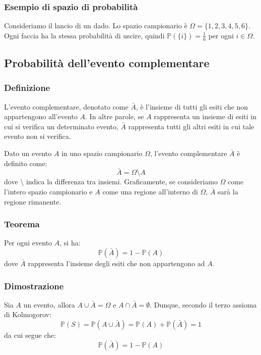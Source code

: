 \documentclass{article}
\begin{document}
\subsubsection{Esempio di spazio di probabilità}
Consideriamo il lancio di un dado. Lo spazio campionario è \(\Omega = \{1, 2, 3, 4, 5, 6\}\).
Ogni faccia ha la stessa probabilità di uscire, quindi \(\mathbb{P}(\{i\}) = \frac{1}{6}\)
per ogni \(i \in \Omega\).

\newpage
\subsection{Probabilità dell'evento complementare}

\subsubsection{Definizione}
L'evento complementare, denotato come \(\bar{A}\), è l'insieme di tutti gli esiti che non
appartengono all'evento \(A\). In altre parole, se \(A\) rappresenta un insieme di esiti in
cui si verifica un determinato evento, \(\bar{A}\) rappresenta tutti gli altri esiti in cui
tale evento non si verifica.

Dato un evento \(A\) in uno spazio campionario \(\Omega\), l'evento complementare \(\bar{A}\) è
definito come:
\[
\bar{A} = \Omega \setminus A
\]
dove \(\setminus\) indica la differenza tra insiemi. Graficamente, se consideriamo \(\Omega\)
come l'intero spazio campionario e \(A\) come una regione all'interno di \(\Omega\), \(\bar{A}\)
sarà la regione rimanente.

\subsubsection{Teorema}
Per ogni evento \(A\), si ha:
\[
\mathbb{P}(\bar{A}) = 1 - \mathbb{P}(A)
\]
dove \(\bar{A}\) rappresenta l'insieme degli esiti che non appartengono ad \(A\).

\subsubsection{Dimostrazione}
Sia \(A\) un evento, allora \(A \cup \bar{A} = \Omega\) e \(A \cap \bar{A} = \emptyset\).
Dunque, secondo il terzo assioma di Kolmogorov:
\[
    \mathbb{P}(S) = \mathbb{P}(A \cup \bar{A}) = \mathbb{P}(A) + \mathbb{P}(\bar{A}) = 1
\]
da cui segue che:
\[
    \mathbb{P}(\bar{A}) = 1 - \mathbb{P}(A)
\]
\end{document}
